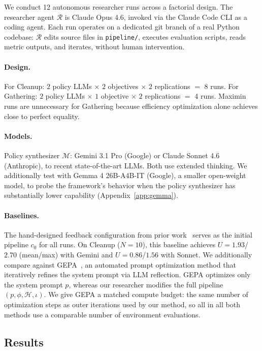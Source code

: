 \documentclass{article}
\newcommand{\cR}{\mathcal{R}}
\newcommand{\cM}{\mathcal{M}}
\begin{document}
We conduct 12 autonomous researcher runs across a factorial design. The researcher agent $\cR$ is Claude Opus 4.6, invoked via the Claude Code CLI as a coding agent. Each run operates on a dedicated git branch of a real Python codebase: $\cR$ edits source files in \texttt{pipeline/}, executes evaluation scripts, reads metric outputs, and iterates, without human intervention.

\paragraph{Design.}
For Cleanup: $2$ policy LLMs $\times$ $2$ objectives $\times$ $2$ replications $=$ 8 runs. For Gathering: $2$ policy LLMs $\times$ $1$ objective $\times$ $2$ replications $=$ 4 runs. Maximin runs are unnecessary for Gathering because efficiency optimization alone achieves close to perfect equality.

\paragraph{Models.}
Policy synthesizer $\cM$: Gemini 3.1 Pro (Google) or Claude Sonnet 4.6 (Anthropic), to recent state-of-the-art LLMs. Both use extended thinking. We additionally test with Gemma 4 26B-A4B-IT (Google), a smaller open-weight model, to probe the framework's behavior when the policy synthesizer has substantially lower capability (Appendix~\ref{app:gemma}).

\paragraph{Baselines.}
The hand-designed feedback configuration from prior work~\cite{gallego2026} serves as the initial pipeline $c_0$ for all runs. On Cleanup ($N{=}10$), this baseline achieves $U{=}1.93$/$2.70$ (mean/max) with Gemini and $U{=}0.86$/$1.56$ with Sonnet. We additionally compare against GEPA~\cite{agrawal2026}, an automated prompt optimization method that iteratively refines the system prompt via LLM reflection. GEPA optimizes only the system prompt $p$, whereas our researcher modifies the full pipeline $(p, \phi, \mathcal{H}, \iota)$. We give GEPA a matched compute budget: the same number of optimization steps as outer iterations used by our method, so all in all both methods use a comparable number of environment evaluations.


\subsection{Results}
\end{document}
